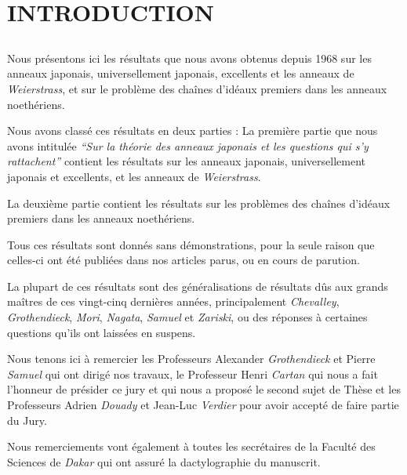 

\setcounter{page}{1}
\chapter*{INTRODUCTION}\thispagestyle{empty}
\label{sec:intro}
\section*{}

Nous présentons ici les résultats que nous avons obtenus depuis 1968 sur les anneaux japonais, universellement japonais, excellents et les anneaux de \emph{Weierstrass}, et sur le problème des chaînes d'idéaux premiers dans les anneaux noethériens.

Nous avons classé ces résultats en deux parties : La première partie que nous avons intitulée \emph{``Sur la théorie des anneaux japonais et les questions qui s'y rattachent''} contient les résultats sur les anneaux japonais, universellement japonais et excellents, et les anneaux de \emph{Weierstrass}.

La deuxième partie contient les résultats sur les problèmes des chaînes d'idéaux premiers dans les anneaux noethériens.

Tous ces résultats sont donnés sans démonstrations, pour la seule raison que celles-ci ont été publiées dans nos articles parus, ou en cours de parution.

La plupart de ces résultats sont des généralisations de résultats dûs aux grands maîtres de ces vingt-cinq dernières années, principalement \emph{Chevalley}, \emph{Grothendieck}, \emph{Mori}, \emph{Nagata}, \emph{Samuel} et \emph{Zariski}, ou des réponses à certaines questions qu'ils ont laissées en suspens.

Nous tenons ici à remercier les Professeurs Alexander \emph{Grothendieck} et Pierre \emph{Samuel} qui ont dirigé nos travaux, le Professeur Henri \emph{Cartan} qui nous a fait l'honneur de présider ce jury et qui nous a proposé le second sujet de Thèse et les Professeurs Adrien \emph{Douady} et Jean-Luc \emph{Verdier} pour avoir accepté de faire partie du Jury.  

Nous remerciements vont également à toutes les secrétaires de la Faculté des Sciences de \emph{Dakar} qui ont assuré la dactylographie du manuscrit.

